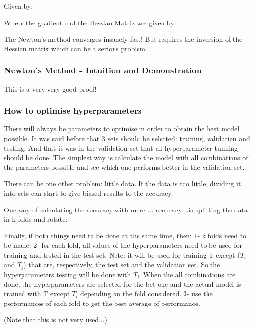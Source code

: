 Given by:


Where the gradient and the Hessian Matrix are given by:


The Newton's method converges insanely fast! But requires the inversion of the Hessian matrix which can be a serious problem...


\subsubsection*{Newton's Method - Intuition and Demonstration}
This is a very very good proof!



\subsubsection{How to optimise hyperparameters}
There will always be parameters to optimise in order to obtain the best model possible.
It was said before that 3 sets should be selected: training, validation and testing.
And that it was in the validation set that all hyperparameter tunning should be done.
The simplest way is calculate the model with all combinations of the parameters possible and see which one performs better in the validation set. 

There can be one other problem: little data. If the data is too little, dividing it into sets can start to give biased results to the accuracy.

One way of calculating the accuracy with more ... accuracy \dots is splitting the data in k folds and rotate:




Finally, if both things need to be done at the same time, then:
1- k folds need to be made. 
2- for each fold, all values of the hyperparameters need to be used for training and tested in the test set.
Note: it will be used for training T except ($T_i$ and $T_j$) that are, respectively, the test set and the validation set. So the hyperparameters testing will be done with $T_i$.
When the all combinations are done, the hyperparameters are selected for the bet one and the actual model is trained with T except $T_i$ depending on the fold considered.
3- use the performances of each fold to get the best average of performance.

(Note that this is not very used...)








